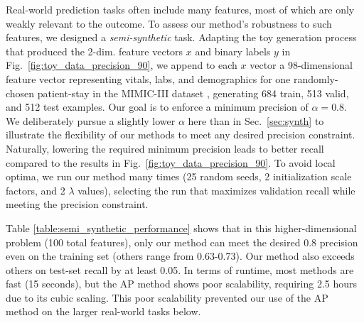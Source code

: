 Real-world prediction tasks often include many features, most of which are only weakly relevant to the outcome. To assess our method's robustness to such features, we designed a \emph{semi-synthetic} task.
Adapting the toy generation process that produced the 2-dim. feature vectors $x$ and binary labels $y$ in Fig.~\ref{fig:toy_data_precision_90}, we append to each $x$ vector a 98-dimensional feature vector representing vitals, labs, and demographics for one randomly-chosen patient-stay in the MIMIC-III dataset \citep{johnsonMIMICIIIFreelyAccessible2016}, generating
684 train, 513 valid, and 512 test examples.
Our goal is to enforce a minimum precision of $\alpha = 0.8$. We deliberately pursue a slightly lower $\alpha$ here than in Sec.~\ref{sec:synth} to illustrate the flexibility of our methods to meet any desired precision constraint. Naturally, lowering the required minimum precision leads to better recall compared to the results in Fig.~\ref{fig:toy_data_precision_90}.
To avoid local optima, we run our method many times (25 random seeds, 2 initialization scale factors, and 2 $\lambda$ values), selecting the run that maximizes validation recall while meeting the precision constraint.

Table \ref{table:semi_synthetic_performance} shows that in this higher-dimensional problem (100 total features), only our method can meet the desired 0.8 precision even on the training set (others range from 0.63-0.73). Our method also exceeds others on test-set recall by at least 0.05. In terms of runtime, most methods are fast (15 seconds), but the AP method \citep{fathonyAPperfIncorporatingGeneric2020} shows poor scalability, requiring 2.5 hours  due to its cubic scaling. 
This poor scalability prevented our use of the AP method on the larger real-world tasks below.
